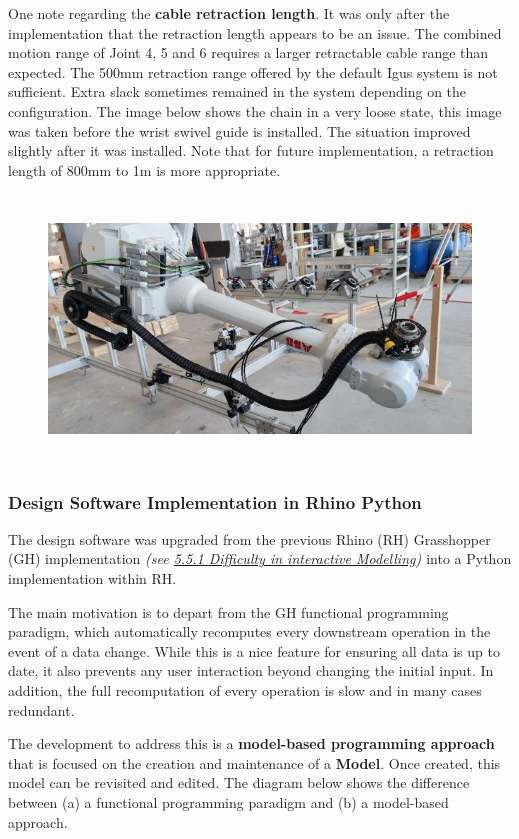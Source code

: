 \documentclass[11pt]{book}
\begin{document}
One note regarding the \textbf{cable retraction length}. It was only after the implementation that the retraction length appears to be an issue. The combined motion range of Joint 4, 5 and 6 requires a larger retractable cable range than expected. The 500mm retraction range offered by the default Igus system is not sufficient. Extra slack sometimes remained in the system depending on the configuration. The image below shows the chain in a very loose state, this image was taken before the wrist swivel guide is installed. The situation improved slightly after it was installed. Note that for future implementation, a retraction length of 800mm to 1m is more appropriate.

\begin{figure}[H]
\includegraphics[width=14.33cm,height=7.11cm]{./images/image11.jpeg}
\end{figure}


\subsubsection{Design Software Implementation in Rhino Python}

The design software was upgraded from the previous Rhino (RH) Grasshopper (GH) implementation \textit{\textcolor[HTML]{B7B7B7}{(see \uline{5.5.1 Difficulty in interactive Modelling}) }}into a Python implementation within RH.

The main motivation is to depart from the GH functional programming paradigm, which automatically recomputes every downstream operation in the event of a data change. While this is a nice feature for ensuring all data is up to date, it also prevents any user interaction beyond changing the initial input. In addition, the full recomputation of every operation is slow and in many cases redundant.

The development to address this is a \textbf{model-based programming approach} that is focused on the creation and maintenance of a \textbf{Model}. Once created, this model can be revisited and edited. The diagram below shows the difference between (a) a functional programming paradigm and (b) a model-based approach.
\end{document}
